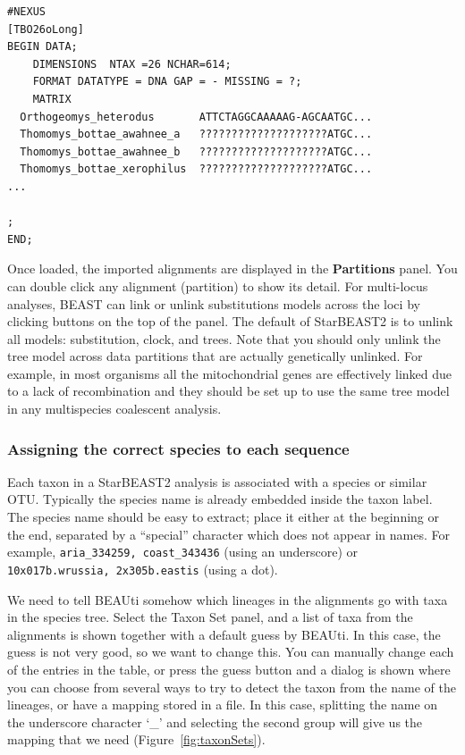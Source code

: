 \documentclass{article}
\begin{document}
\begin{minipage}[h]{0.7\textwidth}
\begin{verbatim}
#NEXUS
[TBO26oLong]
BEGIN DATA;
	DIMENSIONS  NTAX =26 NCHAR=614;
	FORMAT DATATYPE = DNA GAP = - MISSING = ?;
	MATRIX	
  Orthogeomys_heterodus       ATTCTAGGCAAAAAG-AGCAATGC...
  Thomomys_bottae_awahnee_a   ????????????????????ATGC...
  Thomomys_bottae_awahnee_b   ????????????????????ATGC...
  Thomomys_bottae_xerophilus  ????????????????????ATGC...
...

;
END;
\end{verbatim}
\end{minipage}

\vspace{12pt}

Once loaded, the imported alignments are displayed in the \textbf{Partitions}
panel. You can double click any alignment (partition) to show its detail. For
multi-locus analyses, BEAST can link or unlink substitutions models across the
loci by clicking buttons on the top of the panel. The default of StarBEAST2 is
to unlink all models: substitution, clock, and trees. Note
that you should only unlink the tree model across data partitions that are
actually genetically unlinked. For example, in most organisms all the
mitochondrial genes are effectively linked due to a lack of recombination and
they should be set up to use the same tree model in any multispecies coalescent
analysis.

\clearpage

\subsubsection*{Assigning the correct species to each sequence}

Each taxon in a StarBEAST2 analysis is associated with a species or similar OTU.
Typically the species name is already embedded inside the taxon label. The
species name should be easy to extract; place it either at the beginning or the
end, separated by a ``special'' character which does not appear in names. For
example, \texttt{aria\_334259, coast\_343436} (using an underscore) or
\texttt{10x017b.wrussia, 2x305b.eastis} (using a dot).

We need to tell BEAUti somehow which lineages in the alignments go with taxa in
the species tree. Select the Taxon Set panel, and a list of taxa from the
alignments is shown together with a default guess by BEAUti. In this case, the
guess is not very good, so we want to change this. You can manually change each
of the entries in the table, or press the guess button and a dialog is shown
where you can choose from several ways to try to detect the taxon from the name
of the lineages, or have a mapping stored in a file. In this case, splitting the
name on the underscore character `\_' and selecting the second group will give
us the mapping that we need (Figure~\ref{fig:taxonSets}).
\end{document}
